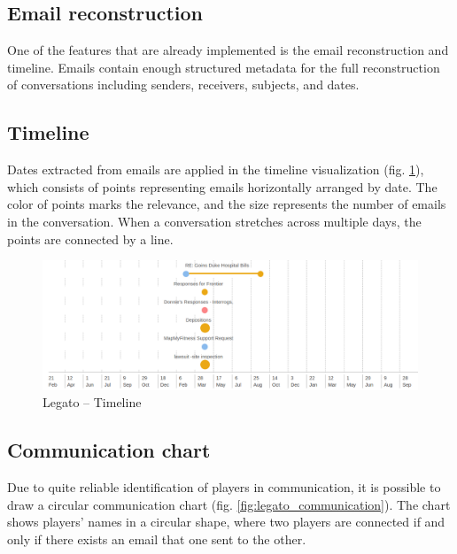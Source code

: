 \documentclass[
  digital, %
  notable,   %
  nolof,     %
  nolot,     %
]{fithesis3}
\begin{document}
\subsection*{Email reconstruction}
One of the features that are already implemented is the email reconstruction and timeline.
Emails contain enough structured metadata for the full reconstruction of conversations including senders, receivers, subjects, and dates.

\subsection*{Timeline}
Dates extracted from emails are applied in the timeline visualization (fig. \ref{fig:legato_timeline}), which consists of points representing emails horizontally arranged by date.
The color of points marks the relevance, and the size represents the number of emails in the conversation.
When a conversation stretches across multiple days, the points are connected by a line.

\begin{figure}[h]
\caption{Legato -- Timeline}
\label{fig:legato_timeline}
\includegraphics[width=\textwidth]{img/Legato-Timeline}
\end{figure}

\subsection*{Communication chart}
Due to quite reliable identification of players in communication, it is possible to draw a circular communication chart (fig. \ref{fig:legato_communication}).
The chart shows players' names in a circular shape, where two players are connected if and only if there exists an email that one sent to the other.
\end{document}
